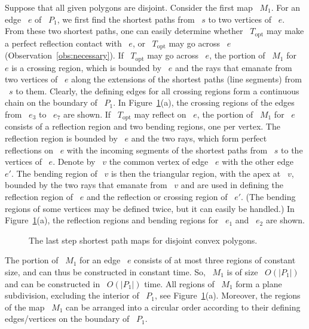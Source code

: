 \documentclass[11pt]{article}
\begin{document}
Suppose that all given polygons are disjoint.
Consider the first map ~\(M_1\).
For an edge ~\(e\) of ~\(P_1\), we first find the shortest paths from ~\(s\) to two vertices of ~\(e\).
From these two shortest paths, one can easily determine whether ~\(T_{\mathrm{opt}}\) may make a perfect reflection contact with ~\(e\), or ~\(T_{\mathrm{opt}}\) may go across ~\(e\) (Observation~\ref{obs:necessary}).
If ~\(T_{\mathrm{opt}}\) may go across ~\(e\), the portion of ~\(M_1\) for ~\(e\) is a crossing region, which is bounded by ~\(e\) and the rays that emanate from two vertices of ~\(e\) along the extensions of the shortest paths (line segments) from ~\(s\) to them.
Clearly, the defining edges for all crossing regions form a continuous chain on the boundary of ~\(P_1\).
In Figure~\ref{fig:disjointmaps}(a), the crossing regions of the edges from ~\(e_3\) to ~\(e_7\) are shown.
If ~\(T_{\mathrm{opt}}\) may reflect on ~\(e\), the portion of ~\(M_1\) for ~\(e\) consists of a reflection region and two bending regions, one per vertex.
The reflection region is bounded by ~\(e\) and the two rays, which form perfect reflections on ~\(e\) with the incoming segments of the shortest paths from ~\(s\) to the vertices of ~\(e\).
Denote by ~\(v\) the common vertex of edge ~\(e\) with the other edge ~\(e'\).
The bending region of ~\(v\) is then the triangular region, with the apex at ~\(v\), bounded by the two rays that emanate from ~\(v\) and are used in defining the reflection region of ~\(e\) and the reflection or crossing region of ~\(e'\).
(The bending regions of some vertices may be defined twice, but it can easily be handled.)
In Figure~\ref{fig:disjointmaps}(a), the reflection regions and bending regions for ~\(e_1\) and ~\(e_2\) are shown.

\begin{figure}[H]
	\centering
	\caption{The last step shortest path maps for disjoint convex polygons.}
	\label{fig:disjointmaps}
\end{figure}

The portion of ~\(M_1\) for an edge ~\(e\) consists of at most three regions of constant size, and can thus be constructed in constant time.
So, ~\(M_1\) is of size ~\(O(|P_1|)\) and can be constructed in ~\(O(|P_1|)\) time.
All regions of ~\(M_1\) form a plane subdivision, excluding the interior of ~\(P_1\), see Figure~\ref{fig:disjointmaps}(a).
Moreover, the regions of the map ~\(M_1\) can be arranged into a circular order according to their defining edges/vertices on the boundary of ~\(P_1\).
\end{document}
